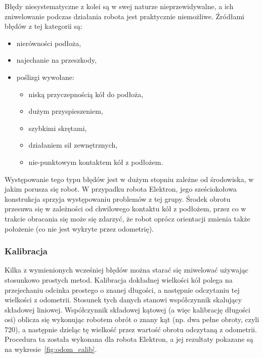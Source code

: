 Błędy niesystematyczne z kolei są w swej naturze nieprzewidywalne, a ich
zniwelowanie podczas działania robota jest praktycznie niemożliwe. Źródłami
błędów z tej kategorii są:
\begin{itemize}
  \item nierówności podłoża,
  \item najechanie na przeszkody,
  \item poślizgi wywołane:
  \begin{itemize}
    \item niską przyczepnością kół do podłoża,
    \item dużym przyspieszeniem,
    \item szybkimi skrętami,
    \item działaniem sił zewnętrznych,
    \item nie-punktowym kontaktem kół z podłożem.
  \end{itemize}
\end{itemize}

Występowanie tego typu błędów jest w dużym stopniu zależne od środowiska, w
jakim porusza się robot. W przypadku robota Elektron, jego sześciokołowa
konstrukcja sprzyja występowaniu problemów z tej grupy. Środek obrotu przesuwa
się w zależności od chwilowego kontaktu kół z podłożem, przez co w trakcie
obracania się może się zdarzyć, że robot oprócz orientacji zmienia także
położenie (co nie jest wykryte przez odometrię).

\subsubsection{Kalibracja}

Kilka z wymienionych wcześniej błędów można starać się zniwelować używając
stosunkowo prostych metod. Kalibracja dokładnej wielkości kół polega na
przejechaniu odcinka prostego o znanej długości, a następnie odczytaniu tej
wielkości z odometrii. Stosunek tych danych stanowi współczynnik skalujący
składowej liniowej. Współczynnik składowej kątowej (a więc kalibrację długości
osi) oblicza się wykonując robotem obrót o znany kąt (np. dwa pełne obroty,
czyli 720\textdegree), a następnie dzieląc tę wielkość przez wartość obrotu
odczytaną z odometrii. Procedura ta została wykonana dla robota Elektron, a jej
rezultaty pokazane są na wykresie~\ref{fig:odom_calib}.

